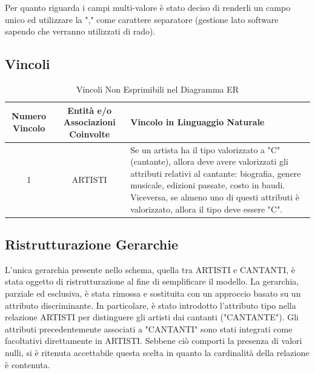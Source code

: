 \documentclass[a4paper,12pt]{article}
\begin{document}
Per quanto riguarda i campi multi-valore è stato deciso di renderli un campo unico ed utilizzare la "," come carattere separatore (gestione lato software sapendo che verranno utilizzati di rado).


\subsection{Vincoli}
\begin{table}[h!]
	\centering
	\begin{tabular}{|c|c|p{6.5cm}|}
		\hline
		\textbf{Numero Vincolo} & \textbf{Entità e/o Associazioni Coinvolte} & \textbf{Vincolo in Linguaggio Naturale} \\ \hline
		1 & ARTISTI & Se un artista ha il tipo valorizzato a "C" (cantante), allora deve avere valorizzati gli attributi relativi al cantante: biografia, genere musicale, edizioni passate, costo in baudi. Viceversa, se almeno uno di questi attributi è valorizzato, allora il tipo deve essere "C".\\ \hline
	\end{tabular}
	\caption{Vincoli Non Esprimibili nel Diagramma ER}
\end{table}

\subsection{Ristrutturazione Gerarchie}
L’unica gerarchia presente nello schema, quella tra ARTISTI e CANTANTI, è stata oggetto di ristrutturazione al fine di semplificare il modello. La gerarchia, parziale ed esclusiva, è stata rimossa e sostituita con un approccio basato su un attributo discriminante. In particolare, è stato introdotto l’attributo tipo nella relazione ARTISTI per distinguere gli artisti dai cantanti ("CANTANTE"). Gli attributi precedentemente associati a "CANTANTI" sono stati integrati come facoltativi direttamente in ARTISTI. Sebbene ciò comporti la presenza di valori nulli, si è ritenuta accettabile questa scelta in quanto la cardinalità della relazione è contenuta.
\end{document}
